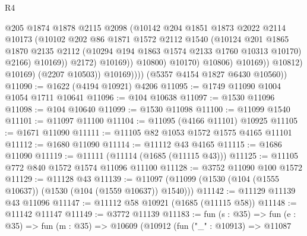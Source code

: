 \begin{lexlean}{R4}
\begin{coremodule}
                                    @205
                                    @1874
                                    @1878
                                    @2115
                                    @2098
                                    (@10142
                                      @204
                                      @1851
                                      @1873
                                      @2022
                                      @2114
                                      @10173
                                      (@10102
                                        @202
                                        @86
                                        @1871
                                        @1572
                                        @2112
                                        @1540
                                        (@10124
                                          @201
                                          @1865
                                          @1870
                                          @2135
                                          @2112
                                          (@10294 @194 @1863 @1574 @2133 @1760 @10313 @10170)
                                          @2166)
                                        @10169))
                                    @2172)
                                  @10169))
                              @10800)
                            @10170)
                          @10806)
                        @10169))
                    @10812)
                  @10169)
                (@2207 @10503))
              @10169))))
      (@5357 @4154 @1827 @6430 @10560))
@11090 := @1622 (@4194 @10921) @4206
@11095 := @1749 @11090 @1004 @1054 @1711 @10641
@11096 := @104 @10638
@11097 := @1530 @11096
@11098 := @104 @10640
@11099 := @1530 @11098
@11100 := @11099 @1540
@11101 := @11097 @11100
@11104 := @11095 (@4166 @11101) @10925
@11105 := @1671 @11090
@11111 := @11105 @82 @1053 @1572 @1575 @4165 @11101
@11112 := @1680 @11090
@11114 := @11112 @43 @4165
@11115 := @1686 @11090
@11119 := @11111 (@11114 (@1685 (@11115 @43)))
@11125 := @11105 @772 @840 @1572 @1574 @11096 @11100
@11128 := @3752 @11090 @100 @1572
@11129 := @11128 @43
@11139 := @11097 (@11099 (@1530 (@104 (@1555 @10637)) (@1530 (@104 (@1559 @10637)) @1540)))
@11142 := @11129 @11139 @43 @11096
@11147 := @11112 @58 @10921 (@1685 (@11115 @58))
@11148 := @11142 @11147
@11149 := @3772 @11139
@11183 := fun (s : @35) =>
  fun (e : @35) =>
  fun (m : @35) =>
  @10609
    (@10912
      (fun ("_" : @10913) =>
      @11087

\end{coremodule}
\end{lexlean}
